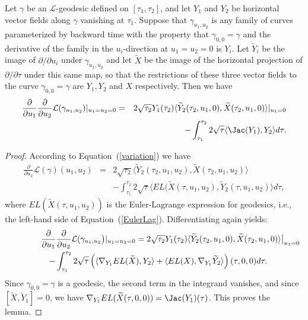 \begin{lemma}\label{lem:l-length-second-variation-formula}
\label{2ndvari}
Let $\gamma$ be an ${\mathcal L}$-geodesic defined on $
[\tau_1,\tau_2]$, and let $Y_1$ and $Y_2$ be horizontal vector
fields along $\gamma$ vanishing at $\tau_1$. Suppose that
$\gamma_{u_1,u_2}$ is any family of curves parameterized by backward
time with the property that $\gamma_{0,0}=\gamma$ and the derivative
of the family in the $u_i$-direction at $u_1=u_2=0$ is $Y_i$. Let
$\widetilde Y_i$ be the image of $\partial/\partial u_i$ under
$\gamma_{u_1,u_2}$ and let $\widetilde X$ be the image of the
horizontal projection of $\partial/\partial \tau$ under this same
map, so that the restrictions of these three vector fields to the
curve $\gamma_{0,0}=\gamma$ are $Y_1,Y_2$ and $X$ respectively. Then
we have \begin{eqnarray*} \frac{\partial}{\partial
u_1}\frac{\partial}{\partial u_2}{\mathcal
L}(\gamma_{u_1,u_2})|_{u_1=u_2=0} & = & 2\sqrt{\tau_2}
Y_1(\tau_2)\langle \widetilde Y_2(\tau_2,u_1,0),\widetilde
X(\tau_2,u_1,0)\rangle|_{u_1=0}\\
& & -\int_{\tau_1}^{\tau_2}2\sqrt{\tau}\langle \Jac(Y_1),Y_2\rangle d\tau.\end{eqnarray*}
\end{lemma}


\begin{proof}
According to Equation~(\ref{variation}) we have
\begin{eqnarray*}
\frac{\partial}{\partial u_2}{\mathcal L}(\gamma)(u_1,u_2)
 & = & 2\sqrt{\tau_2}\langle \widetilde Y_2(\tau_2,u_1,u_2),\widetilde
X(\tau_2,u_1,u_2)\rangle
\\ & & -\int_{\tau_1}^{\tau_2}2\sqrt{\tau}\langle EL(\widetilde
X(\tau,u_1,u_2),\widetilde Y_2(\tau,u_1,u_2)\rangle d\tau,\end{eqnarray*} where
$EL(\widetilde X(\tau,u_1,u_2))$ is the Euler-Lagrange expression for
geodesics, i.e., the left-hand side of Equation~(\ref{EulerLag}).
Differentiating again yields:
\begin{eqnarray}
\lefteqn{\frac{\partial }{\partial u_1}\frac{\partial }{\partial u_2}{\mathcal
L}(\gamma_{u_1,u_2}\bigl)|_{u_1=u_2=0}\big.
 =  2\sqrt{\tau_2}Y_1(\tau_2)\langle \widetilde
Y_2(\tau_2,u_1,0),\widetilde X(\tau_2,u_1,0)\rangle\bigl|_{u_1=0}\bigr.  } \nonumber\\
& & -
\int_{\tau_1}^{\tau_2}2\sqrt{\tau}\left(\langle\nabla_{Y_1}EL(\widetilde
X), Y_2\rangle +\langle EL(X),\nabla_{Y_1}\widetilde
Y_2\rangle\right)(\tau,0,0)d\tau. \label{crosspart} \end{eqnarray}
Since $\gamma_{0,0}=\gamma$ is a geodesic, the second term in the
integrand vanishes, and since $[\widetilde X,\widetilde Y_1]=0$, we
have $\nabla_{Y_1}EL(\widetilde X(\tau,0,0))=\Jac(Y_1)(\tau)$.
This proves the lemma.
\end{proof}

